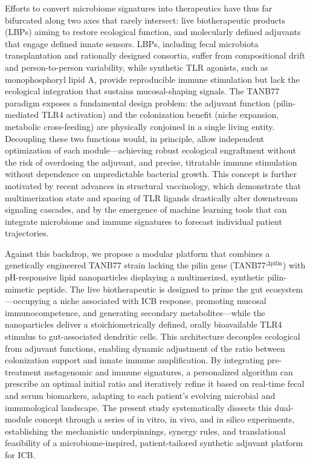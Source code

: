 \documentclass{article}
\begin{document}
Efforts to convert microbiome signatures into therapeutics have thus far bifurcated along two axes that rarely intersect: live biotherapeutic products (LBPs) aiming to restore ecological function, and molecularly defined adjuvants that engage defined innate sensors. LBPs, including fecal microbiota transplantation and rationally designed consortia, suffer from compositional drift and person-to-person variability, while synthetic TLR agonists, such as monophosphoryl lipid A, provide reproducible immune stimulation but lack the ecological integration that sustains mucosal-shaping signals. The TANB77 paradigm exposes a fundamental design problem: the adjuvant function (pilin-mediated TLR4 activation) and the colonization benefit (niche expansion, metabolic cross-feeding) are physically conjoined in a single living entity. Decoupling these two functions would, in principle, allow independent optimization of each module—achieving robust ecological engraftment without the risk of overdosing the adjuvant, and precise, titratable immune stimulation without dependence on unpredictable bacterial growth. This concept is further motivated by recent advances in structural vaccinology, which demonstrate that multimerization state and spacing of TLR ligands drastically alter downstream signaling cascades, and by the emergence of machine learning tools that can integrate microbiome and immune signatures to forecast individual patient trajectories.

Against this backdrop, we propose a modular platform that combines a genetically engineered TANB77 strain lacking the pilin gene (TANB77$^{\Delta\text{pilin}}$) with pH-responsive lipid nanoparticles displaying a multimerized, synthetic pilin-mimetic peptide. The live biotherapeutic is designed to prime the gut ecosystem—occupying a niche associated with ICB response, promoting mucosal immunocompetence, and generating secondary metabolites—while the nanoparticles deliver a stoichiometrically defined, orally bioavailable TLR4 stimulus to gut-associated dendritic cells. This architecture decouples ecological from adjuvant functions, enabling dynamic adjustment of the ratio between colonization support and innate immune amplification. By integrating pre-treatment metagenomic and immune signatures, a personalized algorithm can prescribe an optimal initial ratio and iteratively refine it based on real-time fecal and serum biomarkers, adapting to each patient’s evolving microbial and immunological landscape. The present study systematically dissects this dual-module concept through a series of in vitro, in vivo, and in silico experiments, establishing the mechanistic underpinnings, synergy rules, and translational feasibility of a microbiome-inspired, patient-tailored synthetic adjuvant platform for ICB.
\end{document}
